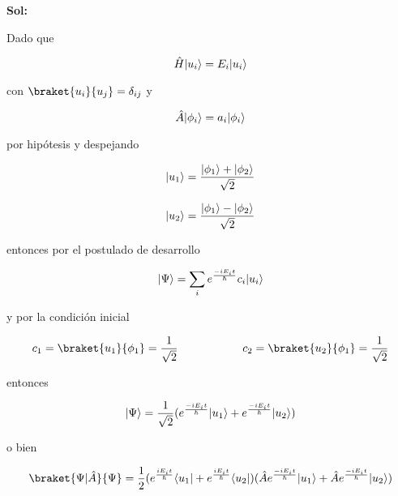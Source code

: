 \documentclass[12pt,a4paper]{article}
\DeclarePairedDelimiter\bra{\langle}{\rvert}
\DeclarePairedDelimiter\ket{\lvert}{\rangle}
\begin{document}
\begin{enumerate}
\begin{enumerate}
    \textbf{Sol:}
    
    Dado que
    
    \begin{equation*}
        \hat{H} \ket{u_i} = E_i \ket{u_i}
    \end{equation*}
    
    con $\braket{u_i}{u_j} = \delta_{ij}$ y
    
    \begin{equation*}
        \hat{A} \ket{\phi_i} = a_i \ket{\phi_i}
    \end{equation*}
    
    por hipótesis y despejando
    
    
    \begin{equation*}
        \ket{u_1} = \frac{\ket{\phi_1} + \ket{\phi_2}}{\sqrt{2}}
    \end{equation*}
    
    \begin{equation*}
        \ket{u_2} = \frac{\ket{\phi_1} - \ket{\phi_2}}{\sqrt{2}}
    \end{equation*}
    
    entonces por el postulado de desarrollo
    
    \begin{equation*}
        \ket{\Psi} = \sum_{i} e^{\frac{-iE_i t}{\hbar}} c_i \ket{u_i}
    \end{equation*}
    
    y por la condición inicial
    
    \begin{equation*}
        c_1 = \braket{u_1}{\phi_1}= \frac{1}{\sqrt{2}} \hspace{2cm} c_2 = \braket{u_2}{\phi_1} = \frac{1}{\sqrt{2}}
    \end{equation*}
    
    entonces
    
    \begin{equation*}
        \ket{\Psi} = \frac{1}{\sqrt{2}} (e^{\frac{-iE_i t}{\hbar}} \ket{u_1} + e^{\frac{-iE_i t}{\hbar}} \ket{u_2})
    \end{equation*}
    
    o bien
    
    \begin{equation*}
        \braket{\Psi|\hat{A}}{\Psi} = \frac{1}{2} (e^{\frac{iE_i t}{\hbar}} \bra{u_1} + e^{\frac{iE_i t}{\hbar}} \bra{u_2})(\hat{A}e^{\frac{-iE_i t}{\hbar}} \ket{u_1} +\hat{A} e^{\frac{-iE_i t}{\hbar}} \ket{u_2})
    \end{equation*}
    

\end{enumerate}
\end{enumerate}
\end{document}

